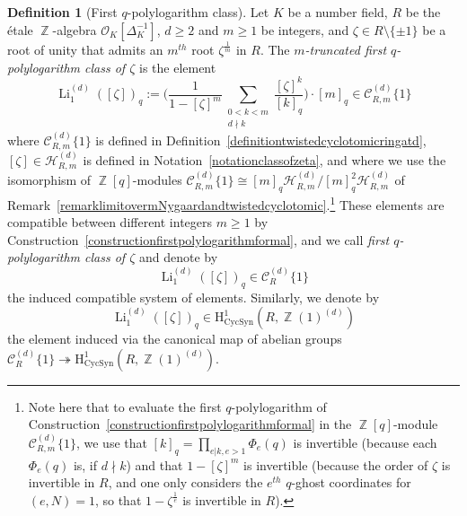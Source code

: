 \documentclass[10pt,twoside]{scrarticle}
\newlength{\mar} \setlength{\mar}{1cm}%
\newlength{\len}
\theoremstyle{definition}
\newtheorem{definition}[theorem]{Definition}
\DeclareMathOperator{\Z}{\mathbb{Z}}
\newcommand{\Li}{\operatorname{Li}}
\newcommand{\CR}{\mathcal{C}_{R}}
\newcommand{\CRm}{\mathcal{C}_{R,m}}
\newcommand{\CycSyn}{\mathrm{CycSyn}}
\renewcommand{\ge}{\geqslant}
\numberwithin{equation}{theorem}
\begin{document}
\begin{definition}[First $q$-polylogarithm class]\label{definitionpolylogarithmcyclosyntomic}
    Let $K$ be a number field, $R$ be the étale $\Z$-algebra $\mathcal{O}_K[\Delta_K^{-1}]$, $d \ge 2$ and $m \ge 1$ be integers, and $\zeta \in R \setminus\{\pm 1\}$ be a root of unity that admits an $m^{th}$ root $\zeta^{\frac{1}{m}}$ in $R$. The \emph{$m$-truncated first $q$-polylogarithm class of $\zeta$} is the element
    $$\Li_1^{(d)}([\zeta])_q := \Big( \frac{1}{1-[\zeta]^m} \sum_{\substack{0 < k < m \\ d \nmid k}} \frac{[\zeta]^k}{[k]_q}\Big) \cdot [m]_q \in \CRm^{(d)}\{1\}$$
    where $\CRm^{(d)}\{1\}$ is defined in Definition~\ref{definitiontwistedcyclotomicringatd}, $[\zeta] \in \mathcal{H}_{R,m}^{(d)}$ is defined in Notation~\ref{notationclassofzeta}, 
    and where we use the isomorphism of $\Z[q]$-modules $\CRm^{(d)}\{1\} \cong [m]_q\mathcal{H}_{R,m}^{(d)}/[m]_q^2\mathcal{H}_{R,m}^{(d)}$ of Remark~\ref{remarklimitovermNygaardandtwistedcyclotomic}.\footnote{Note here that to evaluate the first $q$-polylogarithm of Construction~\ref{constructionfirstpolylogarithmformal} in the $\Z[q]$-module $\mathcal{C}_{R,m}^{(d)}\{1\}$, we use that $[k]_q = \prod_{e|k,e>1} \Phi_e(q)$ is invertible (because each $\Phi_e(q)$ is, if $d \nmid k$) and that $1-[\zeta]^m$ is invertible (because the order of $\zeta$ is invertible in $R$, and one only considers the $e^{th}$ $q$-ghost coordinates for $(e,N) = 1$, so that $1-\zeta^{\frac{1}{e}}$ is invertible in $R$).} These elements are compatible between different integers $m \ge 1$ by Construction~\ref{constructionfirstpolylogarithmformal}, and we call \emph{first $q$-polylogarithm class of $\zeta$} and denote by
    $$\Li_1^{(d)}([\zeta])_q \in \CR^{(d)}\{1\}$$
    the induced compatible system of elements. 
    Similarly, we denote by 
    $$\Li_1^{(d)}([\zeta])_q \in \mathrm{H}^1_{\CycSyn}(R,\Z(1)^{(d)})$$
    the element induced via the canonical map of abelian groups $\CR^{(d)}\{1\} \twoheadrightarrow \text{H}^1_{\CycSyn}(R,\Z(1)^{(d)})$.
\end{definition}
\end{document}
